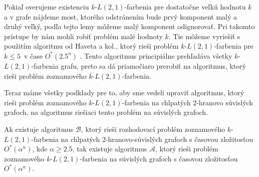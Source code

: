 Pokiaľ overujeme existenciu $k$-$L(2,1)$-farbenia pre dostatočne veľkú hodnotu $k$ a v grafe
nájdeme most, ktorého odstránením bude prvý komponent malý a druhý veľký, podľa tejto lemy
môžeme malý komponent odignorovať. Pri takomto prístupe by nám mohli robiť problém malé
hodnoty $k$. Tie môžeme vyriešiť s použitím algoritmu od Haveta a kol., ktorý rieši
problém $k$-$L(2,1)$-farbenia pre $k \leq 5$ v čase $O^*(2.5^n)$ \cite{havet}. Tento
algoritmus principiálne prehľadáva všetky $k$-$L(2,1)$-farbenia grafu, preto sa dá
priamočiaro prerobiť na algoritmus, ktorý rieši problém zoznamového $k$-$L(2,1)$-farbenia.

Teraz máme všetky podklady pre to, aby sme vedeli upraviť algoritmus,
ktorý rieši problém zoznamového $k$-$L(2,1)$-farbenia na chlpatých
$2$-hranovo súvislých grafoch, na algoritmus riešiaci tento problém
na súvislých grafoch.

\begin{veta}
    Ak existuje algoritmus $\mathcal{B}$, ktorý rieši rozhodovací problém zoznamového $k$-$L(2,1)$-farbenia
    na chlpatých $2$-hranovo-súvislých grafoch s časovou zložitosťou $O^*(\alpha^n)$, kde
    $\alpha \ge 2.5$, tak existuje algoritmus $\mathcal{A}$, ktorý rieši problém zoznamového $k$-$L(2,1)$-farbenia
    na súvislých grafoch s časovou zložitosťou $O^*(\alpha^n)$.
\end{veta}

